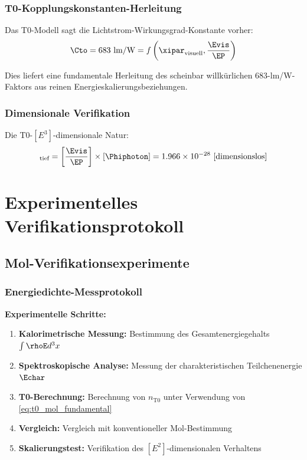	\subsubsection{T0-Kopplungs\-konstanten-Herleitung}
	\label{subsubsec:t0_kopplungsherleitung}
	
	Das T0-Modell sagt die Lichtstrom-Wirkungsgrad-Konstante vorher:
	\begin{equation}
		\Cto = 683 \text{ lm/W} = f\left(\xipar_{\text{visuell}}, \frac{\Evis}{\EP}\right)
		\label{eq:t0_kopplungsvorhersage}
	\end{equation}
	
	Dies liefert eine fundamentale Herleitung des scheinbar willkürlichen 683-lm/W-Faktors aus reinen Energieskalierungsbeziehungen.
	
	\subsubsection{Dimensionale Verifikation}
	\label{subsubsec:candela_dimensionale_verifikation}
	
	Die T0-$[E^3]$-dimensionale Natur:
	\begin{equation}
		[I_{\text{T0}}]_{\text{tief}} = \left[\frac{\Evis}{\EP}\right] \times [\Phiphoton] = 1.966 \times 10^{-28} \text{ [dimensionslos]}
		\label{eq:candela_e3_dimension}
	\end{equation}
	
	\section{Experimentelles Verifikationsprotokoll}
	\label{sec:experimentelles_verifikationsprotokoll}
	
	\subsection{Mol-Verifikationsexperimente}
	\label{subsec:mol_verifikation}
	
	\subsubsection{Energiedichte-Messprotokoll}
	\label{subsubsec:mol_energie_protokoll}
	
	\textbf{Experimentelle Schritte:}
	\begin{enumerate}
		\item \textbf{Kalorimetrische Messung:} Bestimmung des Gesamtenergiegehalts $\int \rhoE d^3x$
		\item \textbf{Spektroskopische Analyse:} Messung der charakteristischen Teilchenenergie $\Echar$
		\item \textbf{T0-Berechnung:} Berechnung von $n_{\text{T0}}$ unter Verwendung von \cref{eq:t0_mol_fundamental}
		\item \textbf{Vergleich:} Vergleich mit konventioneller Mol-Bestimmung
		\item \textbf{Skalierungstest:} Verifikation des $[E^2]$-dimensionalen Verhaltens
	\end{enumerate}
	
